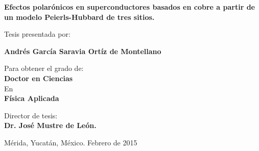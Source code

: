 \bs\bs\bs\bs
\begin{center}
  {\large \bf \bs \bf 
    \hspace{-2.8cm}
    \textsf{Efectos polarónicos en superconductores basados en cobre a partir de un modelo Peierls-Hubbard de tres sitios.}}
\end{center}
\bs\bs\bs
\begin{center}
  {\large 
    \hspace{-2.8cm}
    \textsf{Tesis presentada por:}}
\end{center}
\bs\bs
\begin{center}
  {\large \bf 
    \hspace{-2.8cm}
    \textsf{Andrés García Saravia Ortíz de Montellano}} 
\end{center}
\bs
\begin{center} 
  {\large 
    \hspace{-2.8cm}
    \textsf{Para obtener el grado de:}} \\ 
  \bs \smallskip 
  {\large \bf 
    \hspace{-2.8cm}
    \textsf{Doctor en Ciencias}}\\ 
  \bs 
  {\large 
    \hspace{-2.8cm}
    \textsf{En}} \\
  \bs
  {\bf \large 
    \hspace{-2.8cm}
    \textsf{Física Aplicada}}
\end{center}
\bs\bs\bs
\begin{center}
  \large{\hspace{-2.8cm}
    \textsf{Director de tesis: \\
      \smallskip 
      \hspace{-2.8cm}
      \textbf{Dr. José Mustre de León.}}} \\
\end{center}
\bs\bs\bs\bs\bs\bs\bs
\begin{center}
  {\large 
    \hspace{-2.8cm}
    \textsf{Mérida, Yucatán, México.
      \hspace{5.3cm} Febrero de 2015}}
\end{center}
